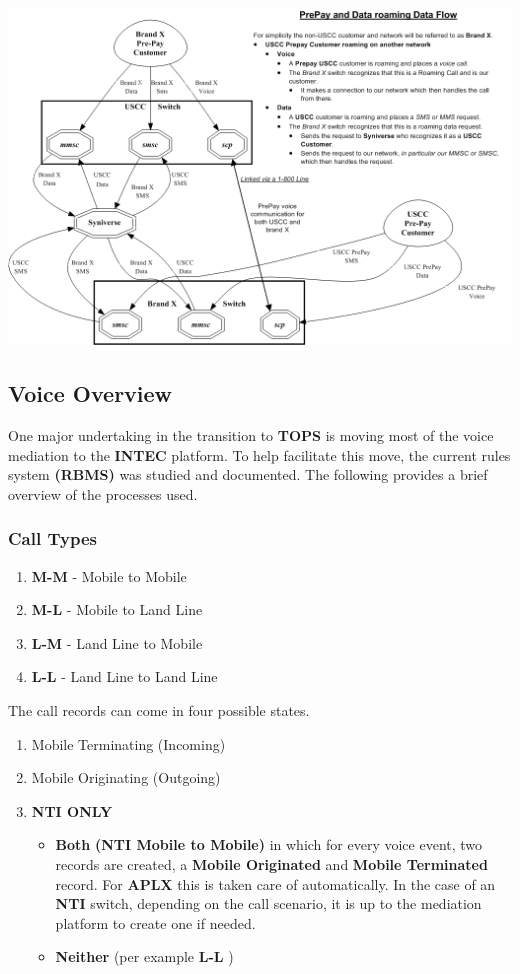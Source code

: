 \documentclass[12pt,twoside]{article}
\begin{document}
\begin{landscape}  
\includegraphics[width=.9\linewidth]{Pictures/roamingPrePay.png}
\end{landscape} 
\newpage
\subsection{Voice Overview}
\label{sec:orgheadline26}
One major undertaking in the transition to \textbf{TOPS} is moving most of the voice mediation to the \textbf{INTEC} platform. To help facilitate this move, the current rules system \textbf{(RBMS)} was studied and documented. The following provides a brief overview of the processes used.
\subsubsection{Call Types}
\label{sec:orgheadline23}
\begin{enumerate}
\item \textbf{M-M} - Mobile to Mobile
\item \textbf{M-L} - Mobile to Land Line
\item \textbf{L-M} - Land Line to Mobile
\item \textbf{L-L} - Land Line to Land Line
\end{enumerate}
The call records can come in four possible states.
\begin{enumerate}
\item Mobile Terminating (Incoming)
\item Mobile Originating (Outgoing)
\item \textbf{NTI ONLY}
\begin{itemize}
\item \textbf{Both}  \newline \textbf{(NTI Mobile to Mobile)} in which for every voice event, two records are created, a \textbf{Mobile Originated} and \textbf{Mobile Terminated} record. For \textbf{APLX} this is taken care of automatically. In the case of an \textbf{NTI} switch, depending on the call scenario, it is up to the mediation platform to create one if needed.
\item \textbf{Neither} \newline (per example \textbf{L-L} )
\end{itemize}
\end{enumerate}
\end{document}
